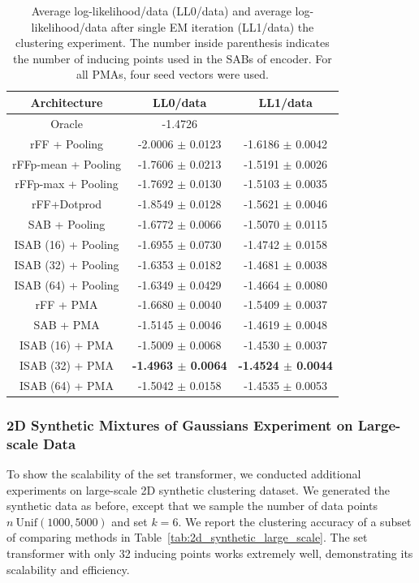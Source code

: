 \documentclass{article}
\begin{document}
\begin{table}[h]
\centering
\caption{Average log-likelihood/data (LL0/data) and average log-likelihood/data after single EM iteration (LL1/data) the clustering experiment. The number inside parenthesis  indicates the number of inducing points used in the SABs of encoder. For all PMAs, four seed vectors were used.}
\vspace{5pt}
\begin{tabular}{@{}ccc@{}} \toprule
Architecture & LL0/data & LL1/data \\ \midrule
Oracle & -1.4726 & \\
\hline
rFF + Pooling& -2.0006 $\pm$ 0.0123 &-1.6186 $\pm$ 0.0042 \\
rFFp-mean + Pooling & -1.7606 $\pm$ 0.0213 &-1.5191 $\pm$ 0.0026 \\
rFFp-max + Pooling & -1.7692 $\pm$ 0.0130 &-1.5103 $\pm$ 0.0035 \\
rFF+Dotprod & -1.8549 $\pm$ 0.0128 &-1.5621 $\pm$ 0.0046 \\
\hline
SAB + Pooling & -1.6772 $\pm$ 0.0066 &-1.5070 $\pm$ 0.0115 \\
ISAB (16) + Pooling & -1.6955 $\pm$ 0.0730 &-1.4742 $\pm$ 0.0158 \\
ISAB (32) + Pooling & -1.6353 $\pm$ 0.0182 &-1.4681 $\pm$ 0.0038 \\
ISAB (64) + Pooling & -1.6349 $\pm$ 0.0429 &-1.4664 $\pm$ 0.0080 \\
rFF + PMA  & -1.6680 $\pm$ 0.0040 &-1.5409 $\pm$ 0.0037 \\
SAB + PMA  & -1.5145 $\pm$ 0.0046 &-1.4619 $\pm$ 0.0048 \\
ISAB (16) + PMA & -1.5009 $\pm$ 0.0068 &-1.4530 $\pm$ 0.0037 \\
ISAB (32) + PMA & \bf -1.4963 $\pm$ 0.0064 & \bf-1.4524 $\pm$ 0.0044 \\
ISAB (64) + PMA & -1.5042 $\pm$ 0.0158 &-1.4535 $\pm$ 0.0053 \\
\bottomrule
\end{tabular}
\label{tab:2d_synthetic_more_results}
\end{table}

\subsubsection{2D Synthetic Mixtures of Gaussians Experiment on Large-scale Data}
To show the scalability of the set transformer, we conducted additional experiments on large-scale 2D synthetic clustering dataset. We generated the synthetic data as before, except that we sample the number of data points $n~\mathrm{Unif}(1000, 5000)$ and set $k=6$. We report the clustering accuracy of a subset of comparing methods in Table~\ref{tab:2d_synthetic_large_scale}. The set transformer with only 32 inducing points works extremely well, demonstrating its scalability and efficiency.
\end{document}
